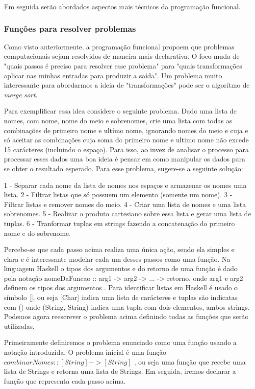 Em seguida serão abordados aspectos mais técnicos da programação funcional.

\subsubsection{Funções para resolver problemas}

Como visto anteriormente, a programação funcional propoem que problemas computacionais sejam resolvidos de maneira mais declarativa.
O foco muda de "quais passos é preciso para resolver esse problema" para "quais transformações aplicar nas minhas entradas para produzir a saída".
Um problema muito interessante para abordarmos a ideia de "transformações" pode ser o algorítmo de \emph{merge sort}.

Para exemplificar essa idea considere o seguinte problema.
Dado uma lista de nomes, com nome, nome do meio e sobrenomes, crie uma lista com todas as combinações de primeiro nome e ultímo nome, ignorando nomes do meio e cuja e só aceitar as combinações cuja soma do primeiro nome e ultimo nome não excede 15 carácteres (incluindo o espaço).
Para isso, ao invez de analisar o processo para processar esses dados uma boa ideia é pensar em como manipular os dados para se obter o resultado esperado.
Para esse problema, sugere-se a seguinte solução:

1 - Separar cada nome da lista de nomes nos espaços e armazenar os nomes uma lista. 
2 - Filtrar listas que só possuem um elemento (somente um nome).
3 - Filtrar listas e remover nomes do meio.
4 - Criar uma lista de nomes e uma lista sobrenomes.
5 - Realizar o produto cartesiano sobre essa lista e gerar uma lista de tuplas.
6 - Tranformar tuplas em strings fazendo a concatenação do primeiro nome e do sobrenome.

Percebe-se que cada passo acima realiza uma única ação, sendo ela simples e clara e é interessante modelar cada um desses passos como uma função.
Na linguagem Haskell o tipos dos argumentos e do retorno de uma função é dado pela notação nomeDaFuncao :: arg1 -> arg2 -> ... -> retorno, onde arg1 e arg2 definem os tipos dos argumentos \cite{lipovaca}.
Para identificar listas em Haskell é usado o símbolo [], ou seja [Char] indica uma lista de carácteres e tuplas são indicatas com () onde (String, String) indica uma tupla com dois elementos, ambos strings.
Podemos agora reescrever o problema acima definindo todas as funções que serão utilizadas.

Primeiramente definiremos o problema enunciado como uma função usando a notação introduzida.
O problema inicial é uma função $combinarNomes :: [String] -> [String]$ , ou seja uma função que recebe uma lista de Strings e retorna uma lista de Strings.
Em seguida, iremos declarar a função que representa cada passo acima.

